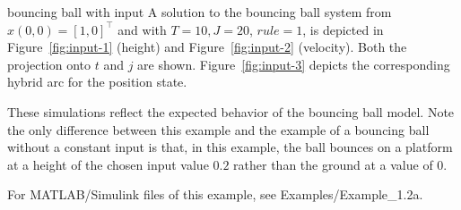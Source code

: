 \begin{example}{bouncing ball with input}
A solution to the bouncing ball system from $x(0,0)=[1,0]^\top$ and with $T=10, J=20$, $rule =1$, is
depicted in Figure~\ref{fig:input-1} (height) and Figure~\ref{fig:input-2} (velocity).  Both the projection
onto $t$ and $j$ are shown. Figure~\ref{fig:input-3} depicts the corresponding hybrid arc for the position state.

These simulations reflect the expected behavior of the bouncing ball model. Note the only
difference between this example and the example of a bouncing ball without a constant input is that, in this example, the ball bounces on a platform at a height of the chosen input value $0.2$ rather than the ground at a value of $0$.

For MATLAB/Simulink files of this example, see Examples/Example\_1.2a.

\end{example}
